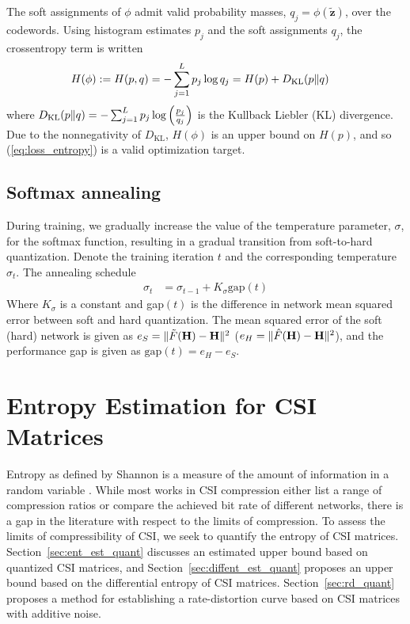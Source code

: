 The soft assignments of $\phi$ admit valid probability masses, $q_j = \phi(\tilde{\mathbf z})$, over the codewords. Using histogram estimates $p_j$ and the soft assignments $q_j$, the crossentropy term is written
\begin{align*}
H(\phi) := H(p,q) &= -\sum_{j=1}^L p_j\log q_j = H(p) + D_{\text{KL}}(p\Arrowvert q)
\end{align*}
where $D_{\text{KL}}(p\Arrowvert q)=-\sum_{j=1}^L p_j \log\left(\frac{p_j}{q_j}\right)$ is the Kullback Liebler (KL) divergence. Due to the nonnegativity of $D_{\text{KL}}$, $H(\phi)$ is an upper bound on $H(p)$, and so (\ref{eq:loss_entropy}) is a valid optimization target.

\subsection{Softmax annealing}

During training, we gradually increase the value of the temperature parameter, $\sigma$, for the softmax function, resulting in a gradual transition from soft-to-hard quantization. Denote the training iteration $t$ and the corresponding temperature $\sigma_t$. The annealing schedule 
\begin{align*}
	\sigma_t &= \sigma_{t-1} + K_{\sigma}\text{gap}(t)
\end{align*}
Where $K_\sigma$ is a constant and gap$(t)$ is the difference in network mean squared error between soft and hard quantization. The mean squared error of the soft (hard) network is given as $e_S=\Arrowvert \tilde F(\mathbf H) - \mathbf H\Arrowvert^2$ ($e_H=\Arrowvert \hat F(\mathbf H) - \mathbf H\Arrowvert^2$), and the performance gap is given as $\text{gap}(t)=e_H - e_S$.

\section{Entropy Estimation for CSI Matrices}

Entropy as defined by Shannon is a measure of the amount of information in a random variable \cite{ref:Shannon1948Mathematical}. While most works in CSI compression either list a range of compression ratios or compare the achieved bit rate of different networks, there is a gap in the literature with respect to the limits of compression. To assess the limits of compressibility of CSI, we seek to quantify the entropy of CSI matrices.
Section~\ref{sec:ent_est_quant} discusses an estimated upper bound based on quantized CSI matrices, and Section~\ref{sec:diffent_est_quant} proposes an upper bound based on the differential entropy of CSI matrices. Section~\ref{sec:rd_quant} proposes a method for establishing a rate-distortion curve based on CSI matrices with additive noise.

